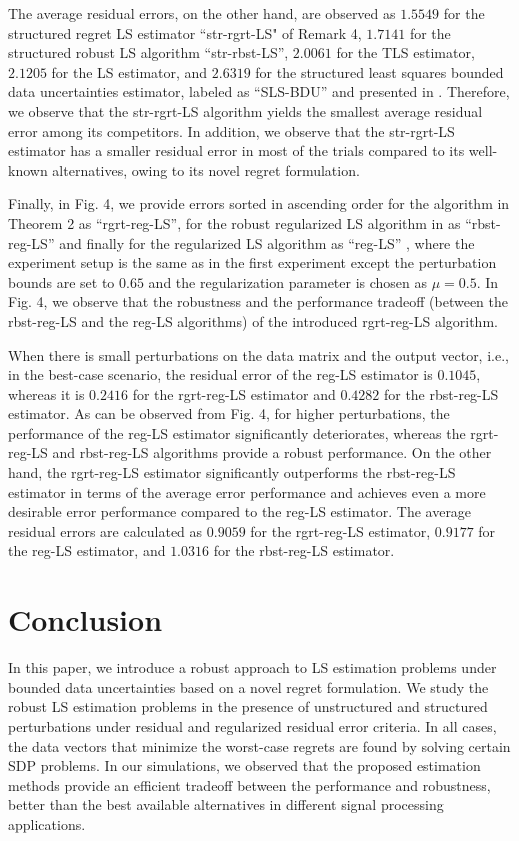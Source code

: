 \documentclass[review,sort&compress]{elsarticle}
\begin{document}
The average residual errors, on the other hand, are observed as $1.5549$ for the structured regret LS estimator ``str-rgrt-LS" of Remark 4, $1.7141$ for the structured robust LS algorithm ``str-rbst-LS'', $2.0061$ for the TLS estimator, $2.1205$ for the LS estimator, and $2.6319$ for the structured least squares bounded data uncertainties estimator, labeled as ``SLS-BDU'' and presented in \cite{pilanci10}. Therefore, we observe that the str-rgrt-LS algorithm yields the smallest average residual error among its competitors. In addition, we observe that the str-rgrt-LS estimator has a smaller residual error in most of the trials compared to its well-known alternatives, owing to its novel regret formulation.

Finally, in Fig. 4, we provide errors sorted in ascending order for the algorithm in Theorem 2 as ``rgrt-reg-LS'', for the robust regularized LS algorithm in \cite{sayed02} as ``rbst-reg-LS'' and finally for the regularized LS algorithm as ``reg-LS'' \cite{Kailath:book}, where the experiment setup is the same as in the first experiment except the perturbation bounds are set to $0.65$ and the regularization parameter is chosen as $\mu=0.5$. In Fig. 4, we observe that the robustness and the performance tradeoff (between the rbst-reg-LS and the reg-LS algorithms) of the introduced rgrt-reg-LS algorithm.

When there is small perturbations on the data matrix and the output vector, i.e., in the best-case scenario, the residual error of the reg-LS estimator is $0.1045$, whereas it is $0.2416$ for the rgrt-reg-LS estimator and $0.4282$ for the rbst-reg-LS estimator. As can be observed from Fig. 4, for higher perturbations, the performance of the reg-LS estimator significantly deteriorates, whereas the rgrt-reg-LS and rbst-reg-LS algorithms provide a robust performance. On the other hand, the rgrt-reg-LS estimator significantly outperforms the rbst-reg-LS estimator in terms of the average error performance and achieves even a more desirable error performance compared to the reg-LS estimator. The average residual errors are calculated as $0.9059$ for the rgrt-reg-LS estimator, $0.9177$ for the reg-LS estimator, and $1.0316$ for the rbst-reg-LS estimator.

\section{Conclusion}\label{sec:conc}
In this paper, we introduce a robust approach to LS estimation problems under bounded data uncertainties based on a novel regret formulation. We study the robust LS estimation problems in the presence of unstructured and structured perturbations under residual and regularized residual error criteria. In all cases, the data vectors that minimize the worst-case regrets are found by solving certain SDP problems. In our simulations, we observed that the proposed estimation methods provide an efficient tradeoff between the performance and robustness, better than the best available alternatives in different signal processing applications.
\end{document}
